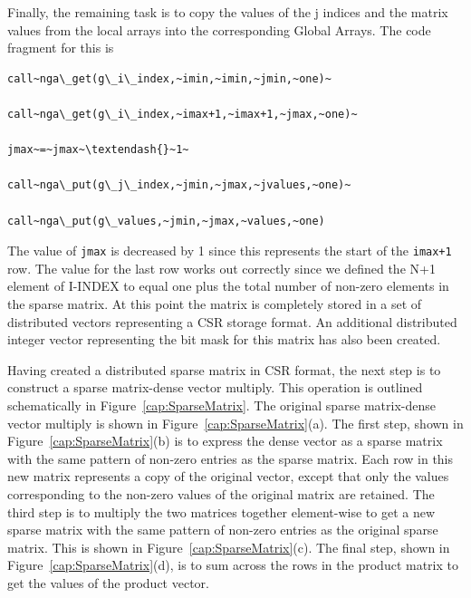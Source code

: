 Finally, the remaining task is to copy the values of the j indices
and the matrix values from the local arrays into the corresponding
Global Arrays. The code fragment for this is
\begin{verbatim}
call~nga\_get(g\_i\_index,~imin,~imin,~jmin,~one)~

call~nga\_get(g\_i\_index,~imax+1,~imax+1,~jmax,~one)~

jmax~=~jmax~\textendash{}~1~

call~nga\_put(g\_j\_index,~jmin,~jmax,~jvalues,~one)~

call~nga\_put(g\_values,~jmin,~jmax,~values,~one)
\end{verbatim}
The value of \texttt{jmax} is decreased by 1 since this represents
the start of the \texttt{imax+1} row. The value for the last row works
out correctly since we defined the N+1 element of I-INDEX to equal
one plus the total number of non-zero elements in the sparse matrix.
At this point the matrix is completely stored in a set of distributed
vectors representing a CSR storage format. An additional distributed
integer vector representing the bit mask for this matrix has also
been created.

Having created a distributed sparse matrix in CSR format, the next
step is to construct a sparse matrix-dense vector multiply. This operation
is outlined schematically in Figure~\ref{cap:SparseMatrix}. The
original sparse matrix-dense vector multiply is shown in Figure~\ref{cap:SparseMatrix}(a).
The first step, shown in Figure~\ref{cap:SparseMatrix}(b) is to
express the dense vector as a sparse matrix with the same pattern
of non-zero entries as the sparse matrix. Each row in this new matrix
represents a copy of the original vector, except that only the values
corresponding to the non-zero values of the original matrix are retained.
The third step is to multiply the two matrices together element-wise
to get a new sparse matrix with the same pattern of non-zero entries
as the original sparse matrix. This is shown in Figure~\ref{cap:SparseMatrix}(c).
The final step, shown in Figure~\ref{cap:SparseMatrix}(d), is to
sum across the rows in the product matrix to get the values of the
product vector.

